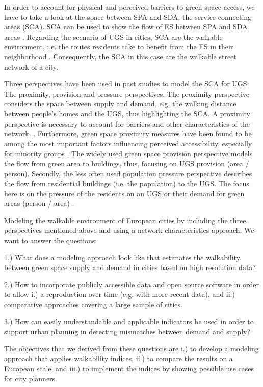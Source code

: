 \documentclass[10pt]{article}
\begin{document}
In order to account for physical and perceived barriers to green space access, we have to take a look at the space between SPA and SDA, the service connecting areas (SCA).
SCA can be used to show the flow of ES between SPA and SDA areas \citep{Syrbe.2012, Dworczyk.2021}.
Regarding the scenario of UGS in cities, SCA are the walkable environment, i.e. the routes residents take to benefit from the ES in their neighborhood \citep{Syrbe.2017}.
Consequently, the SCA in this case are the walkable street network of a city.

Three perspectives have been used in past studies to model the SCA for UGS: The proximity, provision and pressure perspectives.
The proximity perspective considers the space between supply and demand, e.g. the walking distance between people’s homes and the UGS, thus highlighting the SCA. 
A proximity perspective is necessary to account for barriers and other characteristics of the network. \citep{Higgs.2012, Wolff.2021}.
Furthermore, green space proximity measures have been found to be among the most important factors influencing perceived accessibility, especially for minority groups \citep{Ibes.2015, Wang.2015}. 
The widely used green space provision perspective models the flow from green area to buildings, thus, focusing on UGS provision (area / person).
Secondly, the less often used population pressure perspective describes the flow from residential buildings (i.e. the population) to the UGS.
The focus here is on the pressure of the residents on an UGS or their demand for green areas (person / area) \citep{Kimpton.2017}.

Modeling the walkable environment of European cities by including the three perspectives mentioned above and using a network characteristics approach.
We want to answer the questions:

    1.) What does a modeling approach look like that estimates the walkability between green space supply and demand in cities based on high resolution data? 
    
    2.) How to incorporate publicly accessible data and open source software in order to allow i.) a reproduction over time (e.g. with more recent data), and ii.) comparative approaches covering a large sample of cities.
    
    3.) How can easily understandable and applicable indicators be used in order to support urban planning in detecting mismatches between demand and supply?
    
The objectives that we derived from these questions are i.) to develop a modeling approach that applies walkability indices, ii.) to compare the results on a European scale, and iii.) to implement the indices by showing possible use cases for city planners.
\end{document}
